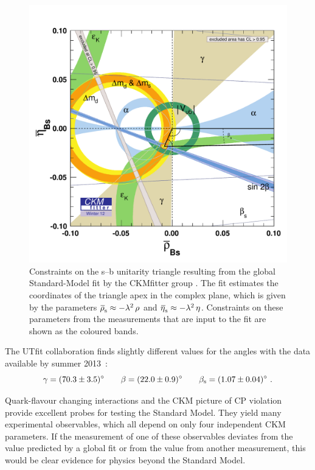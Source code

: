 \begin{figure}[htbp]
  \centering
  \includegraphics[trim=6mm 2mm 2mm 15mm, clip=true, width=\textwidth]{graphics/intro/rhoBsetaBs_large_global_CMYK}
  \caption{Constraints on the s--b unitarity triangle resulting from the global Standard-Model fit by the CKMfitter group
           \cite{Charles:2004jd}. The fit estimates the coordinates of the triangle apex in the complex plane, which is given by the
	   parameters $\rhosbar\approx-\lam^2\,\rho$ and $\etasbar\approx-\lam^2\,\eta$.
           Constraints on these parameters from the measurements that are input to the fit are shown as the coloured bands.}
  \label{fig:unitTriangleMeas_sb}
\end{figure}

The UTfit collaboration finds slightly different values for the angles with the data available by summer 2013~\cite{Bona:2005vz}:
\begin{equation}
  \label{eq:CKMAnglesUTf}
  \gamma = (70.3\pm3.5)^\circ \qquad \beta = (22.0\pm0.9)^\circ \qquad \beta_\text{s} = (1.07\pm0.04)^\circ
  \ .
\end{equation}

Quark-flavour changing interactions and the CKM picture of CP violation provide excellent probes for testing the Standard Model. They yield
many experimental observables, which all depend on only four independent CKM parameters. If the measurement of one of these observables
deviates from the value predicted by a global fit or from the value from another measurement, this would be clear evidence for physics
beyond the Standard Model.

